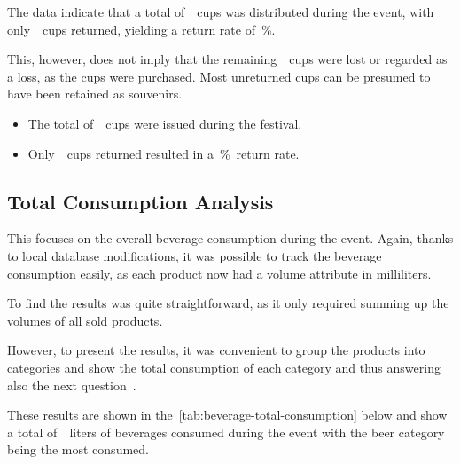 The data indicate that a total of~~cups was distributed during the event, with only~~cups returned, yielding a return rate of~\%.

This, however, does not imply that the remaining~~cups were lost or regarded as a loss, as the cups were purchased.
Most unreturned cups can be presumed to have been retained as souvenirs.

\begin{keytakeaways}
	\begin{itemize}
		\item The total of~~cups were issued during the festival.
		\item Only~~cups returned resulted in a~\%~return rate.
	\end{itemize}
\end{keytakeaways}


\subsection{Total Consumption Analysis}
\label{subsec:analysis-beverage-total-consumption}

This focuses on the overall beverage consumption during the event.
Again, thanks to local database modifications, it was possible to track the beverage consumption easily, as each product now had a volume attribute in milliliters.


To find the results was quite straightforward, as it only required summing up the volumes of all sold products.

However, to present the results, it was convenient to group the products into categories and show the total consumption of each category and thus answering also the next question~.


These results are shown in the~\autoref{tab:beverage-total-consumption} below and show a total of~~liters of beverages consumed during the event with the beer category being the most consumed.

